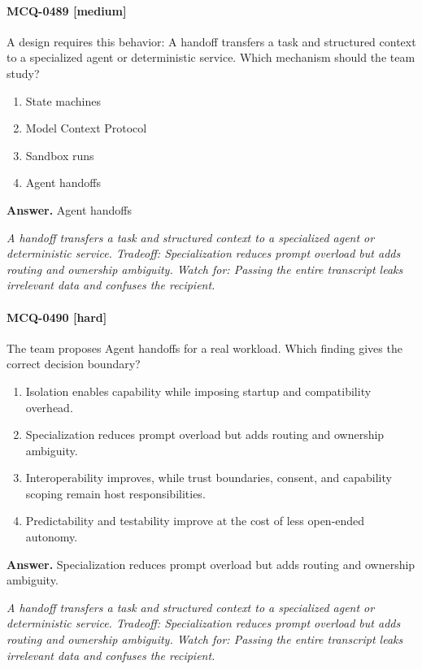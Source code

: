 \paragraph{MCQ-0489 [medium]} A design requires this behavior: A handoff transfers a task and structured context to a specialized agent or deterministic service. Which mechanism should the team study?
\begin{enumerate}[label=\Alph*.]
\item State machines
\item Model Context Protocol
\item Sandbox runs
\item Agent handoffs
\end{enumerate}
\noindent\textbf{Answer.} Agent handoffs
\par\textit{A handoff transfers a task and structured context to a specialized agent or deterministic service. Tradeoff: Specialization reduces prompt overload but adds routing and ownership ambiguity. Watch for: Passing the entire transcript leaks irrelevant data and confuses the recipient.}
\paragraph{MCQ-0490 [hard]} The team proposes Agent handoffs for a real workload. Which finding gives the correct decision boundary?
\begin{enumerate}[label=\Alph*.]
\item Isolation enables capability while imposing startup and compatibility overhead.
\item Specialization reduces prompt overload but adds routing and ownership ambiguity.
\item Interoperability improves, while trust boundaries, consent, and capability scoping remain host responsibilities.
\item Predictability and testability improve at the cost of less open-ended autonomy.
\end{enumerate}
\noindent\textbf{Answer.} Specialization reduces prompt overload but adds routing and ownership ambiguity.
\par\textit{A handoff transfers a task and structured context to a specialized agent or deterministic service. Tradeoff: Specialization reduces prompt overload but adds routing and ownership ambiguity. Watch for: Passing the entire transcript leaks irrelevant data and confuses the recipient.}
